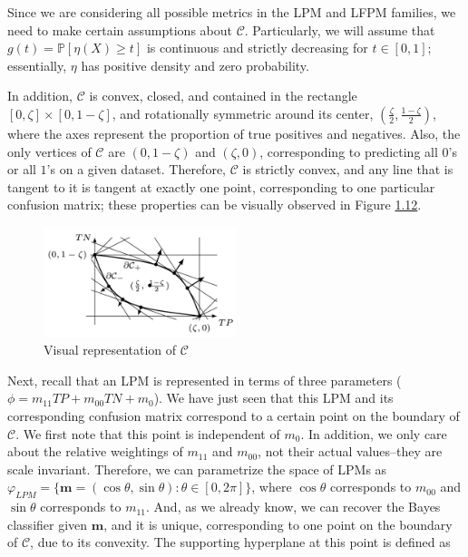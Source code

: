 \documentclass[
  letterpaper,
  DIV=11,
  numbers=noendperiod,
  oneside]{scrreprt}
\theoremstyle{remark}
\begin{document}
Since we are considering all possible metrics in the LPM and LFPM
families, we need to make certain assumptions about \(\mathcal{C}\).
Particularly, we will assume that \(g(t) = \mathbb{P}[\eta(X) \geq t]\)
is continuous and strictly decreasing for \(t \in [0, 1]\); essentially,
\(\eta\) has positive density and zero probability.

In addition, \(\mathcal{C}\) is convex, closed, and contained in the
rectangle \([0, \zeta] \times[0,1-\zeta]\), and rotationally symmetric
around its center, \((\frac{\zeta}{2}, \frac{1-\zeta}{2})\), where the
axes represent the proportion of true positives and negatives. Also, the
only vertices of \(\mathcal{C}\) are \((0,1-\zeta)\) and \((\zeta, 0)\),
corresponding to predicting all \(0\)'s or all \(1\)'s on a given
dataset. Therefore, \(\mathcal{C}\) is strictly convex, and any line
that is tangent to it is tangent at exactly one point, corresponding to
one particular confusion matrix; these properties can be visually
observed in Figure \hyperref[fig:c]{1.12}.

\begin{figure}

{\centering \includegraphics[width=0.5\textwidth,height=\textheight]{Figures/Screenshot 2023-11-13 at 6.56.44 PM.png}

}

\caption{Visual representation of \(\mathcal{C}\)}

\end{figure}%

Next, recall that an LPM is represented in terms of three parameters
(\(\phi = m_{11}TP + m_{00}TN + m_0\)). We have just seen that this LPM
and its corresponding confusion matrix correspond to a certain point on
the boundary of \(\mathcal{C}\). We first note that this point is
independent of \(m_0\). In addition, we only care about the relative
weightings of \(m_{11}\) and \(m_{00}\), not their actual values--they
are scale invariant. Therefore, we can parametrize the space of LPMs as
\(\varphi_{L P M}=\{\mathbf{m}=(\cos \theta, \sin \theta): \theta \in[0,2 \pi]\}\),
where \(\cos \theta\) corresponds to \(m_{00}\) and \(\sin \theta\)
corresponds to \(m_{11}\). And, as we already know, we can recover the
Bayes classifier given \(\mathbf{m}\), and it is unique, corresponding
to one point on the boundary of \(\mathcal{C}\), due to its convexity.
The supporting hyperplane at this point is defined as
\end{document}
